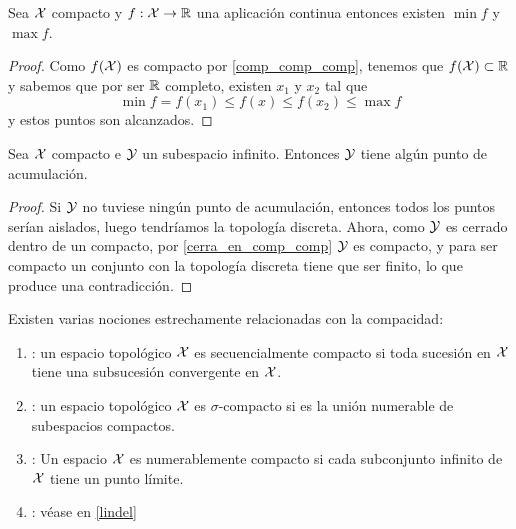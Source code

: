 \begin{prop}
	Sea $\mathcal{X}$ compacto y $f:\mathcal{X} \rightarrow \mathbb{R}$ una aplicación continua entonces existen $\min f$ y $\max f$.
	\begin{proof}
		Como $f(\mathcal{X})$ es compacto por \ref{comp_comp_comp}, tenemos que $f(\mathcal{X}) \subset \mathbb{R}$ y sabemos que por ser $\mathbb{R}$ completo, existen $x_1$ y $x_2$ tal que
		\begin{equation*}
			\min f = f(x_1) \leq f(x) \leq f(x_2) \leq \max f
		\end{equation*}
		y estos puntos son alcanzados.
	\end{proof}
\end{prop}


\begin{prop}
		Sea $\mathcal{X}$ compacto e $\mathcal{Y}$ un subespacio infinito. Entonces $\mathcal{Y}$ tiene algún punto de acumulación.
	\begin{proof}
		Si $\mathcal{Y}$ no tuviese ningún punto de acumulación, entonces todos los puntos serían aislados, luego tendríamos la topología discreta. Ahora, como $\mathcal{Y}$ es cerrado dentro de un compacto, por \ref{cerra_en_comp_comp} $\mathcal{Y}$ es compacto, y para ser compacto un conjunto con la topología discreta tiene que ser finito, lo que produce una contradicción.
	\end{proof}
\end{prop}

\begin{defi}[Definiciones] Existen varias nociones estrechamente relacionadas con la compacidad:
	\begin{enumerate}
		\item {}: un espacio topológico	$\mathcal{X}$ es secuencialmente compacto si toda sucesión en $\mathcal{X}$ tiene una subsucesión convergente en $\mathcal{X}$.
		\item {}:  un espacio topológico $\mathcal{X}$ es $\sigma$-compacto si es la unión numerable de subespacios compactos.
		\item {}: Un espacio $\mathcal{X}$ es numerablemente compacto si cada subconjunto infinito de $\mathcal{X}$ tiene un punto límite.
		\item {}: véase en \ref{lindel}
	\end{enumerate}
\end{defi}

